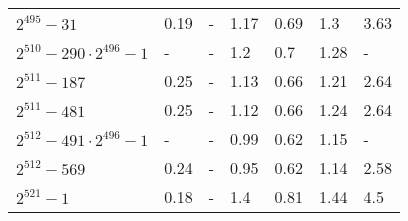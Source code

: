 \documentclass[conference,letterpaper]{IEEEtran}
\begin{document}
\begin{xtabular}{|l|p{0.475cm}|p{0.75cm}@{}|p{0.7cm}@{}|p{0.6cm}@{}|p{0.6cm}@{}|p{0.75cm}@{}|@{}}
	$2^{495}-31$ & 0.19 & - & 1.17 & 0.69 & 1.3 & 3.63 \\
	$2^{510}-290\cdot 2^{496}-1$ & - & - & 1.2 & 0.7 & 1.28 & - \\
	$2^{511}-187$ & 0.25 & - & 1.13 & 0.66 & 1.21 & 2.64 \\
	$2^{511}-481$ & 0.25 & - & 1.12 & 0.66 & 1.24 & 2.64 \\
	$2^{512}-491\cdot 2^{496}-1$ & - & - & 0.99 & 0.62 & 1.15 & - \\
	$2^{512}-569$ & 0.24 & - & 0.95 & 0.62 & 1.14 & 2.58 \\
	$2^{521}-1$ & 0.18 & - & 1.4 & 0.81 & 1.44 & 4.5 \\
\hline
\end{xtabular}

\clearpage

\end{document}
